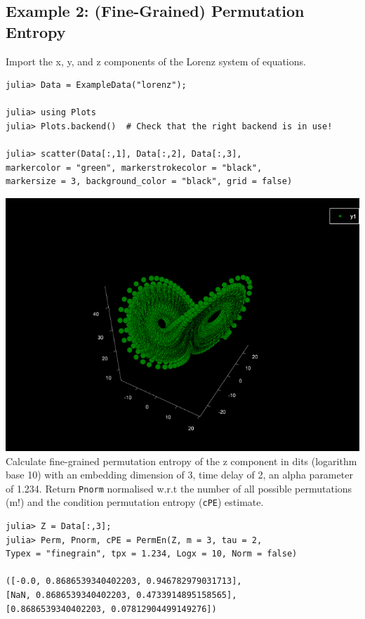 \documentclass[12pt, a4paper, titlepage, openany]{book}
\begin{document}
\subsection{\normalsize Example 2: \hspace{15mm} (Fine-Grained) Permutation Entropy}
\noindent Import the x, y, and z components of the Lorenz system of equations.
\begin{verbatim}
julia> Data = ExampleData("lorenz");

julia> using Plots
julia> Plots.backend()  # Check that the right backend is in use! 

julia> scatter(Data[:,1], Data[:,2], Data[:,3], 
markercolor = "green", markerstrokecolor = "black",
markersize = 3, background_color = "black", grid = false)
\end{verbatim}
\includegraphics[scale=.5]{lorenzjl.png}\newline \newline
\noindent Calculate fine-grained permutation entropy of the z component in dits (logarithm base 10) with an embedding dimension of 3, time delay of 2, an alpha parameter of 1.234. Return \texttt{Pnorm} normalised w.r.t the number of all possible permutations (m!) and the condition permutation entropy (\texttt{cPE}) estimate.
\begin{verbatim}
julia> Z = Data[:,3];
julia> Perm, Pnorm, cPE = PermEn(Z, m = 3, tau = 2, 
Typex = "finegrain", tpx = 1.234, Logx = 10, Norm = false)

([-0.0, 0.8686539340402203, 0.946782979031713], 
[NaN, 0.8686539340402203, 0.4733914895158565], 
[0.8686539340402203, 0.07812904499149276])
\end{verbatim}
\end{document}
